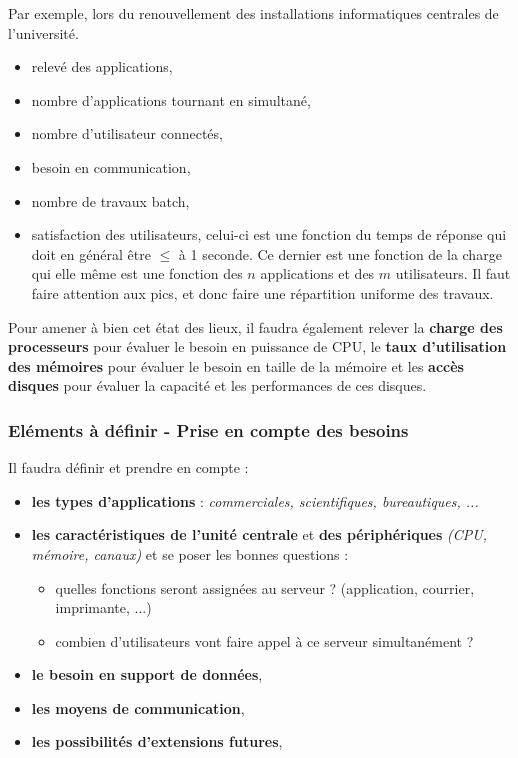 \documentclass[10pt,a4paper,oneside,titlepage]{report}
\newcommand{\titre}[1]{\textcolor{title}{#1}}
\newcommand{\strong}[1]{\textbf{\titre{#1}}}
\begin{document}
\begin{sffamily}
Par exemple, lors du renouvellement des installations informatiques centrales de l'université.
\begin{itemize}
\item relevé des applications,
\item nombre d'applications tournant en simultané,
\item nombre d'utilisateur connectés,
\item besoin en communication,
\item nombre de travaux batch,
\item satisfaction des utilisateurs, celui-ci est une fonction du temps de réponse qui doit en général \^etre $\leq$ à 1 seconde. Ce dernier est une fonction de la charge qui elle m\^eme est une fonction des $n$ applications et des $m$ utilisateurs. Il faut faire attention aux pics, et donc faire une répartition uniforme des travaux.
\end{itemize}

Pour amener à bien cet état des lieux, il faudra également relever la \strong{charge des processeurs} pour évaluer le besoin en puissance de CPU, le \strong{taux d'utilisation des mémoires} pour évaluer le besoin en taille de la mémoire et les 
\strong{accès disques} pour évaluer la capacité et les performances de ces disques.

\subsubsection{Eléments à définir - Prise en compte des besoins}

Il faudra définir et prendre en compte : 
\begin{itemize}
\item \textbf{les types d'applications} : \textit{commerciales, scientifiques, bureautiques, ...}
\item \textbf{les caractéristiques de l'unité centrale} et \textbf{des périphériques} \textit{(CPU, mémoire, canaux)} et se poser les bonnes questions :
\begin{itemize}
\item quelles fonctions seront assignées au serveur ? (application, courrier, imprimante, ...)
\item combien d'utilisateurs vont faire appel à ce serveur simultanément ?
\end{itemize}
\item \textbf{le besoin en support de données},
\item \textbf{les moyens de communication},
\item \textbf{les possibilités d'extensions futures},
\end{itemize}


\end{sffamily}
\end{document}
